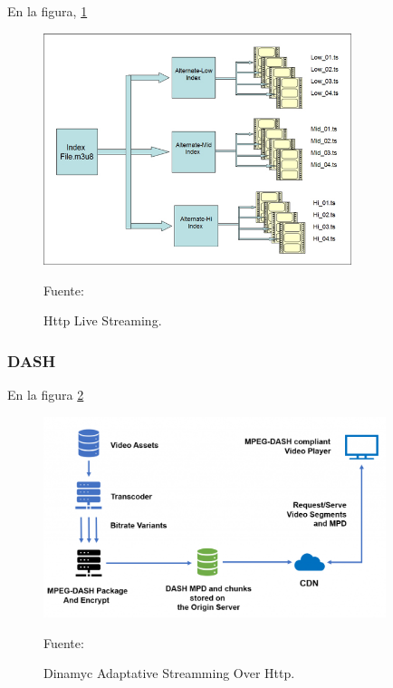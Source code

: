 En la figura, \ref{fig:hls}
\begin{figure}[H]
    \begin{center}
        \includegraphics[width=9cm]{img/capitulo_2/hls.jpg}
        \caption{Http Live Streaming.\\}
        Fuente: \cite{hls}
        \label{fig:hls}
    \end{center}
\end{figure}

\subsubsection{DASH}
En la figura \ref{fig:dash}

\begin{figure}[H]
    \begin{center}
        \includegraphics[width=10cm]{img/capitulo_2/dash.png}
        \caption{Dinamyc Adaptative Streamming Over Http.\\}
        Fuente: \cite{dash}
        \label{fig:dash}
    \end{center}
\end{figure}
    

